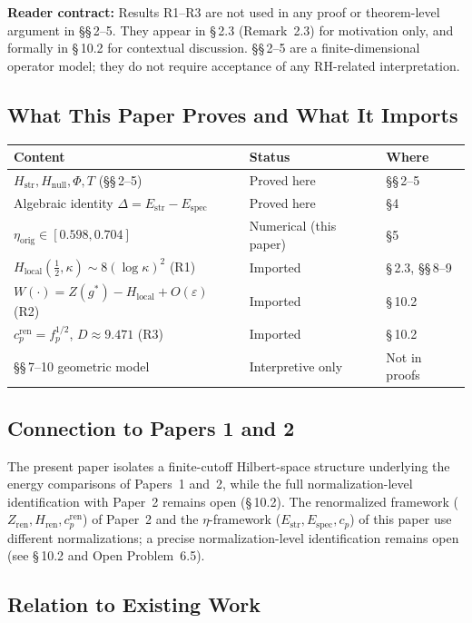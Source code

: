 \documentclass[11pt]{article}
\newcommand{\Hstr}{H_{\mathrm{str}}}
\newcommand{\Hnull}{H_{\mathrm{null}}}
\newcommand{\Estr}{E_{\mathrm{str}}}
\newcommand{\Espec}{E_{\mathrm{spec}}}
\newcommand{\etaorig}{\eta_{\mathrm{orig}}}
\newcommand{\Hlocal}{H_{\mathrm{local}}}
\newcommand{\Hren}{H_{\mathrm{ren}}}
\newcommand{\cren}{c_p^{\mathrm{ren}}}
\begin{document}
\textbf{Reader contract:} Results R1--R3 are not used in any proof or
theorem-level argument in \S\S\,2--5. They appear in \S\,2.3 (Remark~2.3)
for motivation only, and formally in \S\,10.2 for contextual discussion.
\S\S\,2--5 are a finite-dimensional operator model; they do not require
acceptance of any RH-related interpretation.

\subsection{What This Paper Proves and What It Imports}

\begin{center}
\begin{tabular}{lll}
\toprule
Content & Status & Where \\
\midrule
$\Hstr, \Hnull, \Phi, T$ (\S\S\,2--5) & Proved here & \S\S\,2--5 \\
Algebraic identity $\Delta=\Estr-\Espec$ & Proved here & \S4 \\
$\etaorig\in[0.598,0.704]$ & Numerical (this paper) & \S5 \\
$\Hlocal(\tfrac12,\kappa)\sim 8(\log\kappa)^2$ (R1) & Imported \cite{Paper1} & \S\,2.3, \S\S\,8--9 \\
$W(\cdot)=Z(g^*)-\Hlocal+O(\varepsilon)$ (R2) & Imported \cite{Paper2} & \S\,10.2 \\
$\cren=f_p^{1/2}$, $D\approx 9.471$ (R3) & Imported \cite{Paper2} & \S\,10.2 \\
\S\S\,7--10 geometric model & Interpretive only & Not in proofs \\
\bottomrule
\end{tabular}
\end{center}

\subsection{Connection to Papers 1 and 2}

The present paper isolates a finite-cutoff Hilbert-space structure underlying
the energy comparisons of Papers~1 and~2, while the full normalization-level
identification with Paper~2 remains open (\S\,10.2). The renormalized
framework ($Z_{\mathrm{ren}}, \Hren, \cren$) of Paper~2 and the
$\eta$-framework ($\Estr, \Espec, c_p$) of this paper use different
normalizations; a precise normalization-level identification remains open
(see \S\,10.2 and Open Problem~6.5).

\subsection{Relation to Existing Work}
\end{document}
